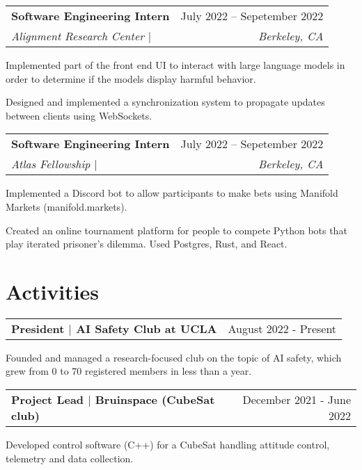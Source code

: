 \documentclass[letterpaper,11pt]{article}
\makeatletter
\newcommand{\resumeSubheading}[4]{
  \vspace{-2pt}\item
    \begin{tabular*}{0.97\textwidth}[t]{l@{\extracolsep{\fill}}r}
      \textbf{#1} & #2 \\
      \textit{\small{#3}} & \textit{\small #4} \\
    \end{tabular*}\vspace{-7pt}
}
\newcommand{\resumeSubheadingShort}[2]{
  \vspace{-2pt}\item
    \begin{tabular*}{0.97\textwidth}[t]{l@{\extracolsep{\fill}}r}
      \textbf{#1} & #2 \\
    \end{tabular*}\vspace{-7pt}
}
\newenvironment{resumeSubheadingList}
{\begin{itemize}[leftmargin=0.1in, label={}]}
{\end{itemize}}
\newenvironment{resumeListBulleted}[1][0.17in]
{\begin{itemize}[leftmargin=#1, noitemsep]\begin{small}}
{\end{small}\end{itemize}\vspace{-5pt}}
\newcommand{\link}[2]{\textnormal{\color{blue}{\href{#1}{\underline{#2}}}}}
\makeatother
\begin{document}
\begin{resumeSubheadingList}
  \resumeSubheading
    {Software Engineering Intern}{July 2022 -- Sepetember 2022}
    {Alignment Research Center $|$ \link{https://alignment.org}{alignment.org}}{Berkeley, CA}
  \begin{resumeListBulleted}
    \item Implemented part of the front end UI to interact with large language models in order to determine if the models display harmful behavior.
    \item Designed and implemented a synchronization system to propagate updates between clients using WebSockets.
  \end{resumeListBulleted}

  \resumeSubheading
    {Software Engineering Intern}{July 2022 -- Sepetember 2022}
    {Atlas Fellowship $|$ \link{https://atlasfellowship.org}{atlasfellowship.org}}{Berkeley, CA}
  \begin{resumeListBulleted}
    \item Implemented a Discord bot to allow participants to make bets using Manifold Markets (manifold.markets).
    \item Created an online tournament platform for people to compete Python bots that play iterated prisoner's dilemma. Used Postgres, Rust, and React.
  \end{resumeListBulleted}
\end{resumeSubheadingList}

\section{Activities}
\begin{resumeSubheadingList}
  \resumeSubheadingShort
    {President $\vert$ AI Safety Club at UCLA} {August 2022 - Present}
  \begin{resumeListBulleted}
    \item Founded and managed a research-focused club on the topic of AI safety, which grew from 0 to 70 registered members in less than a year.
  \end{resumeListBulleted}

  \resumeSubheadingShort
    {Project Lead $\vert$ Bruinspace (CubeSat club)}{December 2021 - June 2022}
  \begin{resumeListBulleted}
    \item Developed control software (C++) for a CubeSat handling attitude control, telemetry and data collection.
  \end{resumeListBulleted}
\end{resumeSubheadingList}
    
\end{document}
